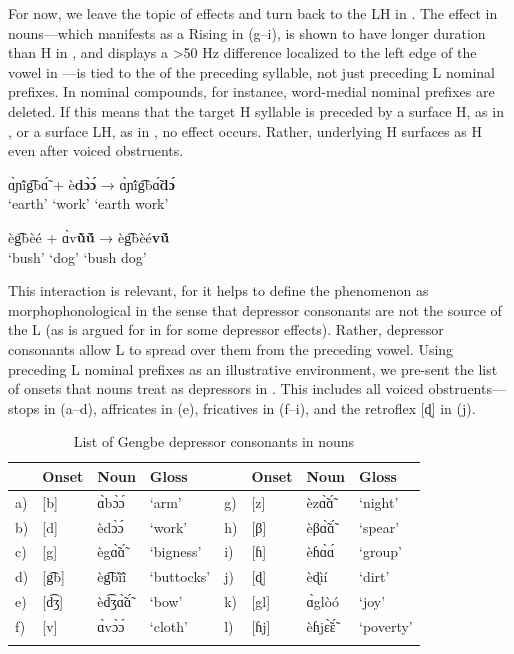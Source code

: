\documentclass[output=paper,newtxmath,modfonts,nonflat]{langsci/langscibook}
\begin{document}
For now, we leave the topic of   effects and turn back to the LH  in . The  effect in nouns—which manifests as a Rising  in  (g–i), is shown to have longer duration than H in , and displays a >50 Hz  difference localized to the left edge of the vowel in —is tied to the  of the preceding syllable, not just preceding L  nominal prefixes. In nominal compounds, for instance, word-medial nominal prefixes are deleted. If this means that the target H  syllable is preceded by a surface H, as in , or a surface LH, as in , no  effect occurs. Rather, underlying H surfaces as H even after voiced obstruents. 

\ea\label{ex:lotven:1}
    \gll ɑ̀ɲĩ́g͡bɑ̃́ + è\textbf{dɔ̀ɔ́} → ɑ̀ɲĩ́g͡bɑ̃́\textbf{dɔ́}\\
    ‘earth’ {} ‘work’ {} {‘earth work’}     \\
    \glt 
    \z

\ea\label{ex:lotven:2}
    \gll èg͡bèé + ɑ̀v\textbf{ũ̀ṹ} → èg͡bèé\textbf{vṹ}\\
    ‘bush’ {} ‘dog’ {} {‘bush dog’}\\
    \glt
    \z
          

This interaction is relevant, for it helps to define the phenomenon as morphophonological in the sense that depressor consonants are not the source of the L  (as is argued for in \citealt{Bradshaw1999} for some depressor effects). Rather, depressor consonants allow L  to spread over them from the preceding vowel. Using preceding L  nominal prefixes as an illustrative environment, we pre-sent the list of  onsets that nouns treat as depressors in . This includes all voiced obstruents—stops in (a–d), affricates in (e), fricatives in (f–i), and the retroflex [ɖ] in (j).

\begin{table}
\begin{tabularx}{\textwidth}{lllXlllX} 
\lsptoprule
&  Onset &  Noun &  Gloss &  &  Onset &  Noun &  Gloss\\
\midrule 
a) & [b]  & ɑ̀bɔ̀ɔ́  & ‘arm’      & {g)} & [z]  & èzɑ̃̀ɑ̃́  & ‘night’\\
b) & [d]  & èdɔ̀ɔ́  & ‘work’     & {h)} & [β]  & èβɑ̃̀ɑ̃́  & ‘spear’\\
c) & [g]  & ègɑ̃̀ɑ̃́  & ‘bigness’  & {i)} & [ɦ]  & èɦɑ̀ɑ́  & ‘group’\\
d) & [g͡b] & èg͡bĩ̀ĩ́ & ‘buttocks’ & {j)} & [ɖ]  & èɖìí          & ‘dirt’\\
e) & [d͡ʒ] & èd͡ʒɑ̃̀ɑ̃́ & ‘bow’      & {k)} & [gl] & ɑ̀glòó         & ‘joy’\\
f) & [v]  & ɑ̀vɔ̀ɔ́  & ‘cloth’    & {l)} & [ɦj] & èɦjɛ̃̀ɛ̃́ & ‘poverty’\\
\lspbottomrule
\end{tabularx}
\caption{List of Gengbe depressor consonants in nouns}
\label{tab:lotven:3}
\end{table}
\end{document}
